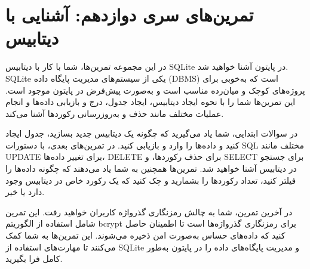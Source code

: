 \documentclass[b5paper,12pt]{article}
\begin{document}
	\newpage
	\section*{تمرین‌های سری دوازدهم: آشنایی با دیتابیس}
	در این مجموعه تمرین‌ها، شما با کار با دیتابیس SQLite در پایتون آشنا خواهید شد. SQLite یکی از سیستم‌های مدیریت پایگاه داده (DBMS) است که به‌خوبی برای پروژه‌های کوچک و میان‌رده مناسب است و به‌صورت پیش‌فرض در پایتون موجود است. این تمرین‌ها شما را با نحوه ایجاد دیتابیس، ایجاد جدول، درج و بازیابی داده‌ها و انجام عملیات مختلف مانند حذف و به‌روزرسانی رکوردها آشنا می‌کند.

	در سوالات ابتدایی، شما یاد می‌گیرید که چگونه یک دیتابیس جدید بسازید، جدول ایجاد کنید و داده‌ها را وارد و بازیابی کنید. در تمرین‌های بعدی، با دستورات SQL مختلف مانند UPDATE برای تغییر داده‌ها، DELETE برای حذف رکوردها، و SELECT برای جستجو در دیتابیس آشنا خواهید شد. تمرین‌ها همچنین به شما یاد می‌دهند که چگونه داده‌ها را فیلتر کنید، تعداد رکوردها را بشمارید و چک کنید که یک رکورد خاص در دیتابیس وجود دارد یا خیر.

	در آخرین تمرین، شما به چالش رمزنگاری گذرواژه کاربران خواهید رفت. این تمرین شامل استفاده از الگوریتم bcrypt برای رمزنگاری گذرواژه‌ها است تا اطمینان حاصل کنید که داده‌های حساس به‌صورت امن ذخیره می‌شوند. این تمرین‌ها به شما کمک می‌کنند تا مهارت‌های استفاده از SQLite و مدیریت پایگاه‌های داده را در پایتون به‌طور کامل فرا بگیرید.
	
\end{document}
